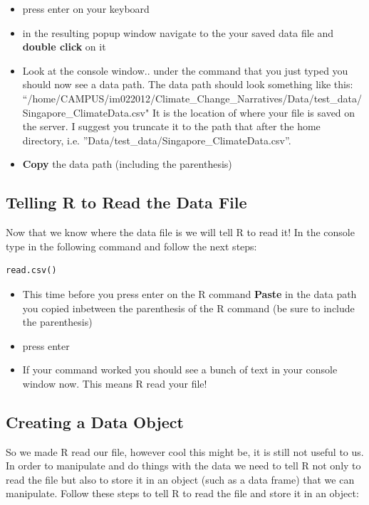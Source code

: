 \documentclass{article}\usepackage[]{graphicx}\usepackage[]{color}
\begin{document}
\begin{itemize} 
\item press enter on your keyboard
\item in the resulting popup window navigate to the your saved data file and \textbf{double click} on it
\item Look at the console window.. under the command that you just typed you should now see a data path. The data path should look something like this: ``/home/CAMPUS/im022012/Climate\_Change\_Narratives/Data/test\_data/Singapore\_ClimateData.csv"  It is the location of where your file is saved on the server. I suggest you truncate it to the path that after the home directory, i.e. ''Data/test\_data/Singapore\_ClimateData.csv''.

\item \textbf{Copy} the data path (including the parenthesis)
\end{itemize}

\subsection{Telling R to Read the Data File}

Now that we know where the data file is we will tell R to read it! In the console type in the following command and follow the next steps: 
\begin{verbatim}
read.csv()
\end{verbatim}

\begin{itemize}
\item This time before you press enter on the R command \textbf{Paste} in the data path you copied inbetween the parenthesis of the R command (be sure to include the parenthesis)
\item press enter
\item If your command worked you should see a bunch of text in your console window now. This means R read your file!
\end{itemize}

\subsection{Creating a Data Object}
So we made R read our file, however cool this might be, it is still not useful to us. In order to manipulate and do things with the data we need to tell R not only to read the file but also to store it in an object (such as a data frame) that we can manipulate. Follow these steps to tell R to read the file and store it in an object: \\
\end{document}
